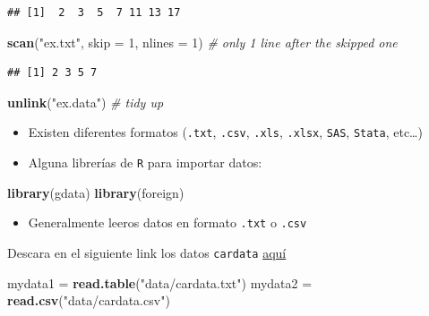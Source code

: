 \documentclass[]{article}
\def\tightlist{}
\newenvironment{Shaded}{\begin{snugshade}}{\end{snugshade}}
\newcommand{\KeywordTok}[1]{\textcolor[rgb]{0.13,0.29,0.53}{\textbf{{#1}}}}
\newcommand{\DataTypeTok}[1]{\textcolor[rgb]{0.13,0.29,0.53}{{#1}}}
\newcommand{\DecValTok}[1]{\textcolor[rgb]{0.00,0.00,0.81}{{#1}}}
\newcommand{\StringTok}[1]{\textcolor[rgb]{0.31,0.60,0.02}{{#1}}}
\newcommand{\CommentTok}[1]{\textcolor[rgb]{0.56,0.35,0.01}{\textit{{#1}}}}
\newcommand{\NormalTok}[1]{{#1}}
\numberwithin{equation}{section}
\begin{document}
\begin{verbatim}
## [1]  2  3  5  7 11 13 17
\end{verbatim}

\begin{Shaded}
\begin{Highlighting}[]
\KeywordTok{scan}\NormalTok{(}\StringTok{"ex.txt"}\NormalTok{, }\DataTypeTok{skip =} \DecValTok{1}\NormalTok{, }\DataTypeTok{nlines =} \DecValTok{1}\NormalTok{) }\CommentTok{# only 1 line after the skipped one}
\end{Highlighting}
\end{Shaded}

\begin{verbatim}
## [1] 2 3 5 7
\end{verbatim}

\begin{Shaded}
\begin{Highlighting}[]
\KeywordTok{unlink}\NormalTok{(}\StringTok{"ex.data"}\NormalTok{) }\CommentTok{# tidy up}
\end{Highlighting}
\end{Shaded}

\begin{itemize}
\item
  Existen diferentes formatos (\texttt{.txt}, \texttt{.csv},
  \texttt{.xls}, \texttt{.xlsx}, \texttt{SAS}, \texttt{Stata},
  etc\ldots{})
\item
  Alguna librerías de \texttt{R} para importar datos:
\end{itemize}

\begin{Shaded}
\begin{Highlighting}[]
\KeywordTok{library}\NormalTok{(gdata)}
\KeywordTok{library}\NormalTok{(foreign)}
\end{Highlighting}
\end{Shaded}

\bigskip

\begin{itemize}
\tightlist
\item
  Generalmente leeros datos en formato \texttt{.txt} o \texttt{.csv}
\end{itemize}

Descara en el siguiente link los datos \texttt{cardata}
\href{data/cardata.zip}{aquí}

\begin{Shaded}
\begin{Highlighting}[]
\NormalTok{mydata1 =}\StringTok{ }\KeywordTok{read.table}\NormalTok{(}\StringTok{"data/cardata.txt"}\NormalTok{) }
\NormalTok{mydata2 =}\StringTok{ }\KeywordTok{read.csv}\NormalTok{(}\StringTok{"data/cardata.csv"}\NormalTok{)  }
\end{Highlighting}
\end{Shaded}
\end{document}
